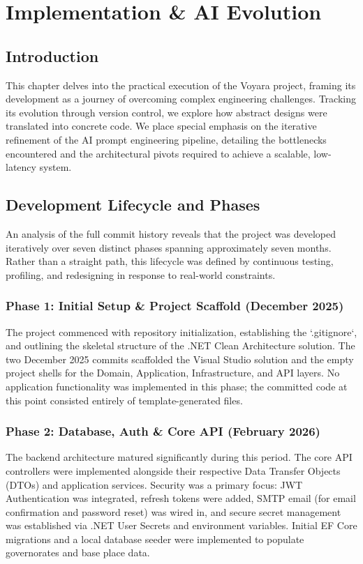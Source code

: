 \chapter{Implementation \& AI Evolution}

\section{Introduction}
This chapter delves into the practical execution of the Voyara project, framing its development as a journey of overcoming complex engineering challenges. Tracking its evolution through version control, we explore how abstract designs were translated into concrete code. We place special emphasis on the iterative refinement of the AI prompt engineering pipeline, detailing the bottlenecks encountered and the architectural pivots required to achieve a scalable, low-latency system.

\section{Development Lifecycle and Phases}
An analysis of the full commit history reveals that the project was developed iteratively over seven distinct phases spanning approximately seven months. Rather than a straight path, this lifecycle was defined by continuous testing, profiling, and redesigning in response to real-world constraints.

\subsection{Phase 1: Initial Setup \& Project Scaffold (December 2025)}
The project commenced with repository initialization, establishing the `.gitignore`, and outlining the skeletal structure of the .NET Clean Architecture \cite{clean_architecture} solution. The two December 2025 commits scaffolded the Visual Studio solution and the empty project shells for the Domain, Application, Infrastructure, and API layers. No application functionality was implemented in this phase; the committed code at this point consisted entirely of template-generated files.

\subsection{Phase 2: Database, Auth \& Core API (February 2026)}
The backend architecture matured significantly during this period. The core API controllers were implemented alongside their respective Data Transfer Objects (DTOs) and application services. Security was a primary focus: JWT Authentication was integrated, refresh tokens were added, SMTP email (for email confirmation and password reset) was wired in, and secure secret management was established via .NET User Secrets and environment variables. Initial EF Core migrations and a local database seeder were implemented to populate governorates and base place data.

